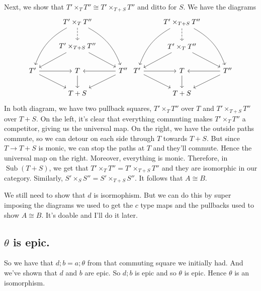 \documentclass[12pt]{article}
\newcommand{\op}[1]{\operatorname{#1}}
\renewcommand{\(}{\left(}
\renewcommand{\)}{\right)}
\renewcommand{\{}{\left\lbrace}
\renewcommand{\}}{\right\rbrace}
\theoremstyle{remark}
\theoremstyle{definition}
\begin{document}
  Next, we show that $T'\times_TT'' \cong T' \times_{T+S}T''$ and ditto for 
  $S$.  We have the diagrams
  \[
  \begin{tikzcd}
	  {} &
	  {T'\times_TT''} \ar[d,dashed] \ar[ddl,bend right=20] \ar[ddr,bend 
	  left=20] &
	  {} \\
	  {} &
	  {T'\times_{T+S}T''} \ar[dr] \ar[dl] &
	  {} \\
	  {T'} \ar[dr] \ar[r] &
	  {T} \ar[d]&
	  {T''} \ar[dl] \ar[l]\\
	  {} &
	  {T+S} &
	  {}
  \end{tikzcd}
  \begin{tikzcd}
  {} &
  {T'\times_{T+S}T''} \ar[d,dashed] \ar[ddl,bend right=20] \ar[ddr,bend 
  left=20] &
  {} \\
  {} &
  {T'\times_{T}T''} \ar[dr] \ar[dl] &
  {} \\
  {T'} \ar[dr] \ar[r] &
  {T} \ar[d]&
  {T''} \ar[dl] \ar[l]\\
  {} &
  {T+S} &
  {}
  \end{tikzcd}
  \]
  In both diagram, we have two pullback squares, $T'\times_TT''$ over $T$ and 
  $T' \times_{T+S}T''$ over $T+S$.  On the left, it's clear that everything 
  commuting makes $T'\times_TT''$ a competitor, giving us the universal map.  
  On the right, we have the outside paths commute, so we can detour on each 
  side through $T$ towards $T+S$.  But since $T \to T+S$ is monic, we can stop 
  the paths at $T$ and they'll commute.  Hence the universal map on the right.  
  Moreover, everything is monic.  Therefore, in $\op{Sub} (T+S)$, we get that 
  $T'\times_TT'' = T' \times_{T+S}T''$ and they are isomorphic in our category. 
  Similarly, $S'\times_SS'' = S' \times_{T+S}S''$.  It follows that $A \cong 
  B$. 
  
  We still need to show that $d$ is isormophism.  But we can do this by super 
  imposing the diagrams we used to get the $c$ type maps and the pullbacks used 
  to show $A \cong B$.  It's doable and I'll do it later.
  
  \subsection*{$\theta$ is epic.}
  
  So we have that $d;b=a;\theta$ from that commuting square we initially had.  
  And we've shown that $d$ and $b$ are epic.  So $d;b$ is epic and so $\theta$ 
  is epic.  Hence $\theta$ is an isomorphism.  
  
\end{document}
